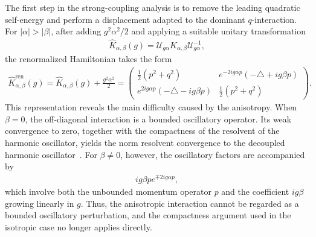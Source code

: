 \documentclass[12pt,dvipdfmx]{article}
\begin{document}
The first step in the strong-coupling analysis is to remove the leading quadratic self-energy and perform a displacement adapted to the dominant $q$-interaction. For $|\alpha|>|\beta|$, after adding $g^2\alpha^2/2$ and applying a suitable unitary transformation 
\begin{align*}\hat{K}_{\alpha,\beta}(g)=
\mathcal{U} _{g\alpha} K_{\alpha,\beta}\mathcal{U} _{g\alpha}^{-1},\end{align*} 
the renormalized Hamiltonian takes the form
\begin{align*}
    \hat{K}_{\alpha,\beta}^{\mathrm{ren} }(g)
    =\hat{K}_{\alpha,\beta}(g)+\frac{g^2\alpha^2}{2}=    \begin{pmatrix}
        \frac12 (p^2 + q^2) & e^{-2ig\alpha p} (-\triangle + ig\beta p)\\
        e^{2ig\alpha p}(-\triangle - ig\beta p) & \frac12 (p^2 + q^2)
    \end{pmatrix}.
\end{align*}
This representation reveals the main difficulty caused by the anisotropy. When $\beta=0$, the off-diagonal interaction is a bounded oscillatory operator. Its weak convergence to zero, together with the compactness of the resolvent of the harmonic oscillator, yields the norm resolvent convergence to the decoupled harmonic oscillator~\cite{Hirokawa15, HMS17,HS25a,RW24}. For $\beta\ne0$, however, the oscillatory factors are accompanied by
\begin{align*}
    ig\beta p e^{\mp2ig\alpha p},
\end{align*}
which involve both the unbounded momentum operator $p$ and the  coefficient $ig\beta$ growing linearly in $g$. Thus, the anisotropic interaction cannot be regarded as a bounded oscillatory perturbation, and the compactness argument used in the isotropic case no longer applies directly.
\end{document}
